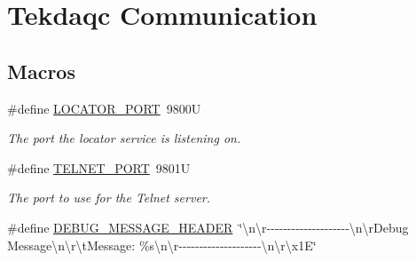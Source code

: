 \hypertarget{group__tekdaqc__communication}{\section{Tekdaqc Communication}
\label{group__tekdaqc__communication}
}
\subsection*{Macros}
\begin{DoxyCompactItemize}
\item 
\hypertarget{group__tekdaqc__communication_ga5a136fbad6cb2fa002bd9fd5a9288336}{\#define \hyperlink{group__tekdaqc__communication_ga5a136fbad6cb2fa002bd9fd5a9288336}{L\-O\-C\-A\-T\-O\-R\-\_\-\-P\-O\-R\-T}~9800\-U}\label{group__tekdaqc__communication_ga5a136fbad6cb2fa002bd9fd5a9288336}

\begin{DoxyCompactList}\small\item\em The port the locator service is listening on. \end{DoxyCompactList}\item 
\hypertarget{group__tekdaqc__communication_gad036d23530f3aa396f7cc2dba2e8fb2e}{\#define \hyperlink{group__tekdaqc__communication_gad036d23530f3aa396f7cc2dba2e8fb2e}{T\-E\-L\-N\-E\-T\-\_\-\-P\-O\-R\-T}~9801\-U}\label{group__tekdaqc__communication_gad036d23530f3aa396f7cc2dba2e8fb2e}

\begin{DoxyCompactList}\small\item\em The port to use for the Telnet server. \end{DoxyCompactList}\item 
\hypertarget{group__tekdaqc__communication_ga9c4bc7a3b0d3be416cbbb1af90028590}{\#define \hyperlink{group__tekdaqc__communication_ga9c4bc7a3b0d3be416cbbb1af90028590}{D\-E\-B\-U\-G\-\_\-\-M\-E\-S\-S\-A\-G\-E\-\_\-\-H\-E\-A\-D\-E\-R}~\char`\"{}\textbackslash{}n\textbackslash{}r-\/-\/-\/-\/-\/-\/-\/-\/-\/-\/-\/-\/-\/-\/-\/-\/-\/-\/-\/-\/\textbackslash{}n\textbackslash{}r\-Debug Message\textbackslash{}n\textbackslash{}r\textbackslash{}t\-Message\-: \%s\textbackslash{}n\textbackslash{}r-\/-\/-\/-\/-\/-\/-\/-\/-\/-\/-\/-\/-\/-\/-\/-\/-\/-\/-\/-\/\textbackslash{}n\textbackslash{}r\textbackslash{}x1\-E\char`\"{}}\label{group__tekdaqc__communication_ga9c4bc7a3b0d3be416cbbb1af90028590}


\end{DoxyCompactItemize}
